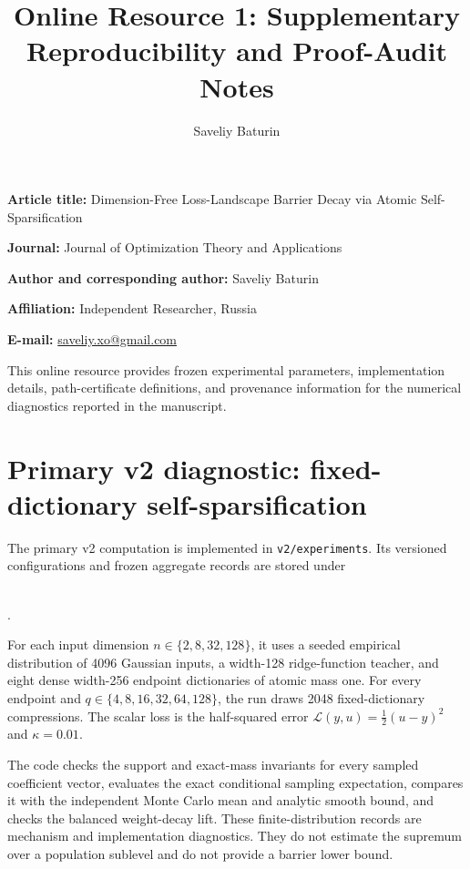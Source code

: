 \documentclass[11pt,a4paper]{article}
\title{Online Resource 1: Supplementary Reproducibility and Proof-Audit Notes}
\author{Saveliy Baturin}
\date{}
\begin{document}
\maketitle

\begin{center}
\begin{minipage}{0.9\textwidth}
\textbf{Article title:} Dimension-Free Loss-Landscape Barrier Decay via Atomic
Self-Sparsification

\textbf{Journal:} Journal of Optimization Theory and Applications

\textbf{Author and corresponding author:} Saveliy Baturin

\textbf{Affiliation:} Independent Researcher, Russia

\textbf{E-mail:} \href{mailto:saveliy.xo@gmail.com}{saveliy.xo@gmail.com}
\end{minipage}
\end{center}

\medskip
\noindent
This online resource provides frozen experimental parameters, implementation
details, path-certificate definitions, and provenance information for the
numerical diagnostics reported in the manuscript.

\section*{Primary v2 diagnostic: fixed-dictionary self-sparsification}

The primary v2 computation is implemented in \texttt{v2/experiments}.  Its
versioned configurations and frozen aggregate records are stored under
\begin{center}
\\
.
\end{center}
For each
input dimension $n\in\{2,8,32,128\}$, it uses a seeded empirical distribution
of 4096 Gaussian inputs, a width-128 ridge-function teacher, and eight dense
width-256 endpoint dictionaries of atomic mass one.  For every endpoint and
$q\in\{4,8,16,32,64,128\}$, the run draws 2048 fixed-dictionary
compressions.  The scalar loss is the half-squared error
$\mathcal L(y,u)=\tfrac12(u-y)^2$ and $\kappa=0.01$.

The code checks the support and exact-mass invariants for every sampled
coefficient vector, evaluates the exact conditional sampling expectation,
compares it with the independent Monte Carlo mean and analytic smooth bound,
and checks the balanced weight-decay lift.  These finite-distribution records
are mechanism and implementation diagnostics.  They do not estimate the
supremum over a population sublevel and do not provide a barrier lower bound.
\end{document}
